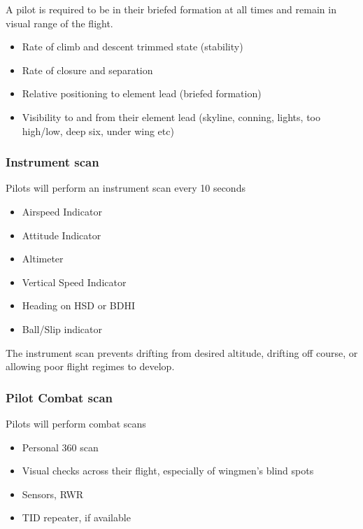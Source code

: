 A pilot is required to be in their briefed formation at all times and remain in
visual range of the flight.

\begin{itemize}

  \item Rate of climb and descent trimmed state (stability)

  \item Rate of closure and separation

  \item Relative positioning to element lead (briefed formation)

  \item Visibility to and from their element lead (skyline, conning, lights,
    too high/low, deep six, under wing etc)

\end{itemize}

\subsubsection{Instrument scan}

Pilots will perform an instrument scan every 10 seconds

\begin{itemize}
  \item Airspeed Indicator
  \item Attitude Indicator
  \item Altimeter
  \item Vertical Speed Indicator
  \item Heading on HSD or BDHI
  \item Ball/Slip indicator
\end{itemize}

The instrument scan prevents drifting from desired altitude, drifting off
course, or allowing poor flight regimes to develop.

\subsubsection{Pilot Combat scan}

Pilots will perform combat scans

\begin{itemize}
  \item Personal 360 scan
  \item Visual checks across their flight, especially of wingmen's blind spots
  \item Sensors, RWR
  \item TID repeater, if available
\end{itemize}

